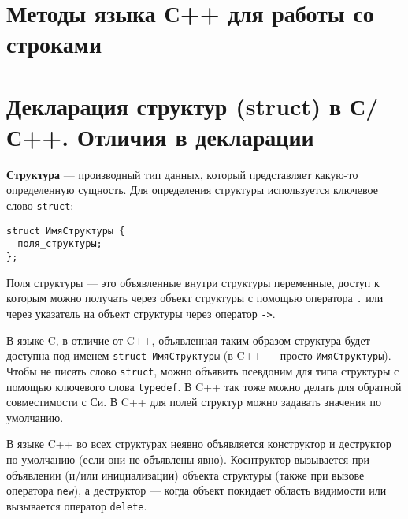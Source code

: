 \section{Методы языка С++ для работы со строками}

\section{Декларация структур (struct) в С/С++. Отличия в декларации}
\textbf{Структура} \label{def:struct} --- производный тип данных, который представляет какую-то определенную сущность.
Для определения структуры используется ключевое слово \verb|struct|:

\begin{verbatim}
struct ИмяСтруктуры {
  поля_структуры;
};
\end{verbatim}
Поля структуры --- это объявленные внутри структуры переменные, доступ к которым можно получать через объект структуры
с помощью оператора \verb|.| или через указатель на объект структуры через оператор \verb|->|.

В языке C, в отличие от C++, объявленная таким образом структура будет доступна под именем
\verb|struct ИмяСтруктуры| (в C++ --- просто \verb|ИмяСтруктуры|). Чтобы не писать слово
\verb|struct|, можно объявить псевдоним для типа структуры с помощью ключевого слова
\verb|typedef|. В C++ так тоже можно делать для обратной совместимости с Си. В C++
для полей структур можно задавать значения по умолчанию.

{\small В языке C++ во всех структурах неявно объявляется конструктор и деструктор по умолчанию
(если они не объявлены явно). Коснтруктор вызывается при объявлении (и/или инициализации) объекта
структуры (также при вызове оператора \verb|new|), а деструктор --- когда объект покидает
область видимости или вызывается оператор \verb|delete|.}

